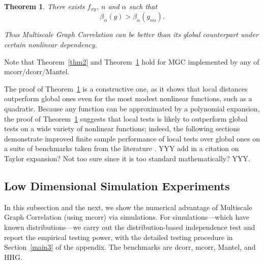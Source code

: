 \documentclass[11pt]{article}
\newtheorem{thm}{Theorem}
\begin{document}
\begin{thm}
\label{thm3}
There exists $f_{xy}$, $n$ and $\alpha$ such that 
\begin{equation}
\beta_{\alpha}(g) > \beta_{\alpha}(g_{nn}).
\end{equation}

Thus Multiscale Graph Correlation can be better than its global counterpart under certain nonlinear dependency.
\end{thm}
Note that Theorem~\ref{thm2} and Theorem~\ref{thm3} hold for MGC implemented by any of mcorr/dcorr/Mantel.

The proof of Theorem~\ref{thm3} is a constructive one, as it shows that local distances outperform global ones even for the most modest nonlinear functions, such as a quadratic.  Because any function can be approximated by a polynomial expansion, the proof of Theorem~\ref{thm3} suggests that local tests is likely to outperform global tests on a wide variety of nonlinear functions; indeed, the following sections demonstrate improved finite sample performance of local tests over global ones on a suite of benchmarks taken from the literature \cite{SzekelyRizzoBakirov2007, SimonTibshirani2012, GorfineHellerHeller2012, HellerGorfine2013}.
YYY add in a citation on Taylor expansion? Not too sure since it is too standard mathematically? YYY.



\subsection{Low Dimensional Simulation Experiments}
\label{numer1}
In this subsection and the next, we show the numerical advantage of Multiscale Graph Correlation (using mcorr) via simulations. For simulations---which have known distributions---we carry out the distribution-based independence test and report the empirical testing power, with the detailed testing procedure in Section~\ref{main3} of the appendix. The benchmarks are dcorr, mcorr, Mantel, and HHG.

\end{document}
